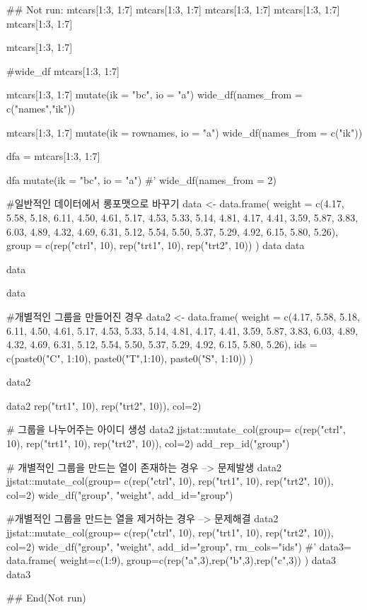 \documentclass[a4paper]{book}
\begin{document}
\begin{Examples}
\begin{ExampleCode}

## Not run: 
mtcars[1:3, 1:7]
mtcars[1:3, 1:7] %
mtcars[1:3, 1:7] %
mtcars[1:3, 1:7] %
mtcars[1:3, 1:7] %

mtcars[1:3, 1:7] %

#wide_df
mtcars[1:3, 1:7] %

mtcars[1:3, 1:7] %
  mutate(ik = "bc", io = "a")%
  wide_df(names_from = c("names","ik"))


mtcars[1:3, 1:7] %
  mutate(ik = rownames, io = "a")%
  wide_df(names_from = c("ik"))%

dfa = mtcars[1:3, 1:7] %

dfa%
  mutate(ik = "bc", io = "a")%
#'   wide_df(names_from = 2)


#일반적인 데이터에서  롱포맷으로 바꾸기
data <- data.frame(
  weight = c(4.17, 5.58, 5.18, 6.11, 4.50, 4.61, 5.17, 4.53, 5.33, 5.14,
             4.81, 4.17, 4.41, 3.59, 5.87, 3.83, 6.03, 4.89, 4.32, 4.69,
             6.31, 5.12, 5.54, 5.50, 5.37, 5.29, 4.92, 6.15, 5.80, 5.26),
  group = c(rep("ctrl", 10), rep("trt1", 10), rep("trt2", 10))
)
data
data%

data%

data  %


#개별적인 그룹을 만들어진 경우
data2 <- data.frame(
  weight = c(4.17, 5.58, 5.18, 6.11, 4.50, 4.61, 5.17, 4.53, 5.33, 5.14,
             4.81, 4.17, 4.41, 3.59, 5.87, 3.83, 6.03, 4.89, 4.32, 4.69,
             6.31, 5.12, 5.54, 5.50, 5.37, 5.29, 4.92, 6.15, 5.80, 5.26),
  ids = c(paste0("C", 1:10), paste0("T",1:10), paste0("S", 1:10))
)

data2

data2 %
                 rep("trt1", 10), rep("trt2", 10)), col=2)

# 그룹을 나누어주는 아이디 생성
data2 %
jjstat::mutate_col(group= c(rep("ctrl", 10),
        rep("trt1", 10), rep("trt2", 10)), col=2)%
        add_rep_id("group")

# 개별적인 그룹을 만드는 열이 존재하는 경우 --> 문제발생
data2 %
    jjstat::mutate_col(group= c(rep("ctrl", 10),
          rep("trt1", 10), rep("trt2", 10)), col=2)%
          wide_df("group", "weight", add_id="group")

#개별적인 그룹을 만드는 열을 제거하는 경우 --> 문제해결
data2 %
  jjstat::mutate_col(group= c(rep("ctrl", 10),
  rep("trt1", 10), rep("trt2", 10)),  col=2)%
  wide_df("group", "weight", add_id="group", rm_cols="ids") %
#'
data3= data.frame(
  weight=c(1:9),
  group=c(rep("a",3),rep("b",3),rep("c",3))
)
data3
data3 %

## End(Not run)

\end{ExampleCode}
\end{Examples}
\end{document}
